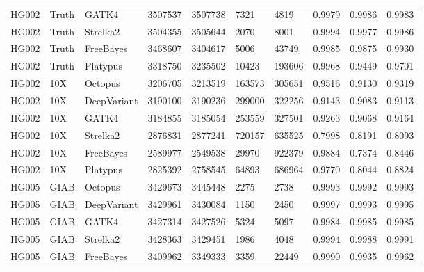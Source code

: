 \documentclass{article}
\begin{document}
\begin{table}[ht!]
{\begin{tabular}{llllllllll}
      HG002 &        Truth &        GATK4 &           3507537 &       3507738 &      7321 &      4819 &    0.9979 &      0.9986 &    0.9983 \\
      HG002 &        Truth &     Strelka2 &           3504355 &       3505644 &      2070 &      8001 &    0.9994 &      0.9977 &    0.9986 \\
      HG002 &        Truth &    FreeBayes &           3468607 &       3404617 &      5006 &     43749 &    0.9985 &      0.9875 &    0.9930 \\
      HG002 &        Truth &     Platypus &           3318750 &       3235502 &     10423 &    193606 &    0.9968 &      0.9449 &    0.9701 \\
      HG002 &          10X &      Octopus &           3206705 &       3213519 &    163573 &    305651 &    0.9516 &      0.9130 &    0.9319 \\
      HG002 &          10X &  DeepVariant &           3190100 &       3190236 &    299000 &    322256 &    0.9143 &      0.9083 &    0.9113 \\
      HG002 &          10X &        GATK4 &           3184855 &       3185054 &    253559 &    327501 &    0.9263 &      0.9068 &    0.9164 \\
      HG002 &          10X &     Strelka2 &           2876831 &       2877241 &    720157 &    635525 &    0.7998 &      0.8191 &    0.8093 \\
      HG002 &          10X &    FreeBayes &           2589977 &       2549538 &     29970 &    922379 &    0.9884 &      0.7374 &    0.8446 \\
      HG002 &          10X &     Platypus &           2825392 &       2758545 &     64893 &    686964 &    0.9770 &      0.8044 &    0.8824 \\
      HG005 &         GIAB &      Octopus &           3429673 &       3445448 &      2275 &      2738 &    0.9993 &      0.9992 &    0.9993 \\
      HG005 &         GIAB &  DeepVariant &           3429961 &       3430084 &      1150 &      2450 &    0.9997 &      0.9993 &    0.9995 \\
      HG005 &         GIAB &        GATK4 &           3427314 &       3427526 &      5324 &      5097 &    0.9984 &      0.9985 &    0.9985 \\
      HG005 &         GIAB &     Strelka2 &           3428363 &       3429451 &      1986 &      4048 &    0.9994 &      0.9988 &    0.9991 \\
      HG005 &         GIAB &    FreeBayes &           3409962 &       3349333 &      3359 &     22449 &    0.9990 &      0.9935 &    0.9962 \\

\end{tabular}}
\end{table}
\end{document}
